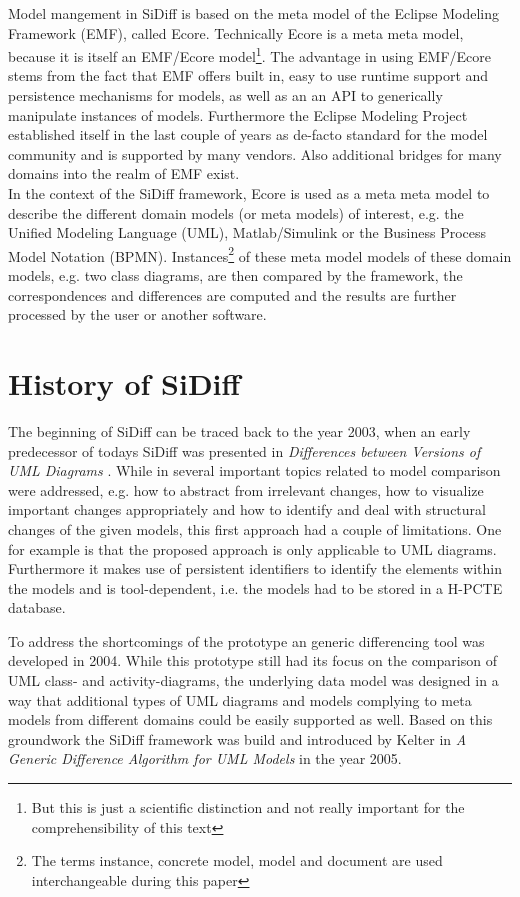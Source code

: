 \documentclass{article}
\begin{document}
Model mangement in SiDiff is based on the meta model of the Eclipse Modeling Framework (EMF), called Ecore. Technically Ecore is a meta meta model, because it 
is itself an EMF/Ecore model\footnote{But this is just a scientific distinction and not really important for the comprehensibility of this text}. The advantage in using EMF/Ecore stems from the 
fact that EMF offers built in, easy to use runtime support and persistence mechanisms for models, as well as an an API to generically manipulate instances of models. Furthermore the Eclipse 
Modeling Project established itself in the last couple of years as de-facto standard for the model community and is supported by many vendors. Also additional bridges 
for many domains into the realm of EMF exist.\\ 

In the context of the SiDiff framework, Ecore is used as a meta meta model to describe the different domain models (or meta models) of interest, e.g. the Unified Modeling Language (UML), Matlab/Simulink or the Business Process Model Notation (BPMN). Instances\footnote{The terms instance, concrete model, model and document are used interchangeable during this paper} of these meta model models of these domain models, e.g. two class diagrams, are then compared by the framework, the correspondences and differences are computed and the results are further processed by the user or another software.  


\section{History of SiDiff}
\label{sechistory}

The beginning of SiDiff can be traced back to the year 2003, when an early predecessor of todays SiDiff was 
presented in \textit{Differences between Versions of UML Diagrams} \cite{Ohst03DiffVer}. 
While in \cite{Ohst03DiffVer} several important topics related to model comparison were 
addressed, e.g. how to abstract from irrelevant changes, how to visualize important changes appropriately and how to 
identify and deal with structural changes of the given models, this first approach had a couple of limitations. One for example is 
that the proposed approach is only applicable to UML diagrams. Furthermore it makes use of persistent identifiers to identify the elements 
within the models and is tool-dependent, i.e. the models had to be stored in a H-PCTE database.

To address the shortcomings of the prototype an generic differencing tool \cite{Weh04SiDiff} was developed in 2004. While 
this prototype still had its focus on the comparison of UML class- and activity-diagrams, 
the underlying data model was designed in a way that additional types of UML diagrams and models complying to meta models from different domains 
could be easily supported as well. Based on this groundwork the SiDiff framework was build and introduced by Kelter in 
\textit{A Generic Difference Algorithm for UML Models} \cite{Kel05DiffAlg} in the year 2005.  
\end{document}
